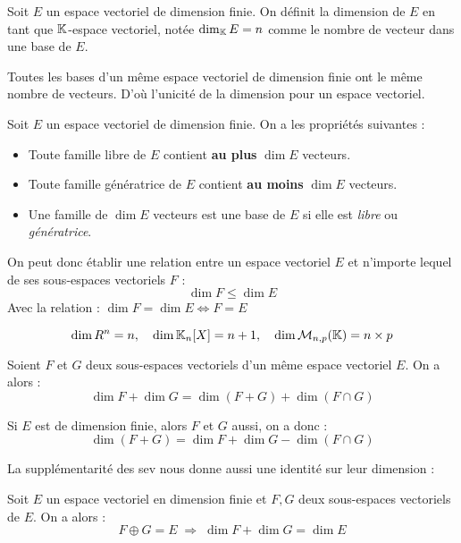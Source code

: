 \begin{definition}[Dimension]
    Soit $E$ un espace vectoriel de dimension finie. 
    On définit la dimension de $E$ en tant que $\mathbb{K}$-espace vectoriel, notée $ \dim_{\mathbb{K}} E = n$
    comme le nombre de vecteur dans une base de $E$. 
\end{definition}

\begin{remark}
    Toutes les bases d'un même espace vectoriel de dimension finie ont le même nombre de vecteurs. 
    D'où l'unicité de la dimension pour un espace vectoriel. 
\end{remark}

\begin{prop}[Dimension]
    Soit $E$ un espace vectoriel de dimension finie. On a les propriétés suivantes : 
    \begin{itemize}
        \item Toute famille libre de $E$ contient \textbf{au plus} $\dim E$ vecteurs. 
        \item Toute famille génératrice de $E$ contient \textbf{au moins} $\dim E$ vecteurs. 
        \item Une famille de $\dim E$ vecteurs est une base de $E$ si elle est \emph{libre} ou \emph{génératrice}. 
    \end{itemize}
\end{prop}

\begin{proposition}
    On peut donc établir une relation entre un espace vectoriel $E$ et n'importe lequel de ses sous-espaces vectoriels $F$ : 
        \[ \dim F \leqslant \dim E \] 
    Avec la relation : $\dim F = \dim E \iff F = E $
\end{proposition}

\begin{example}
    \[ \dim R^n = n, \quad \dim \mathbb{K}_{n}[X] = n + 1, \quad \dim \mathcal{M}_{n,p}(\mathbb{K}) = n \times p \] 
\end{example}

\begin{theorem}
    Soient $F$ et $G$ deux sous-espaces vectoriels d'un même espace vectoriel $E$. 
    On a alors : 
        \[ \boxed{\dim F + \dim G = \dim (F + G) + \dim (F \cap G)} \] 
\end{theorem}

Si $E$ est de dimension finie, alors $F$ et $G$ aussi, on a donc : 
    \[ \dim (F + G) = \dim F + \dim G - \dim (F \cap G) \] 

La supplémentarité des sev nous donne aussi une identité sur leur dimension : 

\begin{theorem}
    Soit $E$ un espace vectoriel en dimension finie et $F,G$ deux sous-espaces vectoriels de $E$. 
    On a alors : 
        \[ F \oplus G = E \; \Longrightarrow \; \dim F + \dim G = \dim E \] 
\end{theorem}













